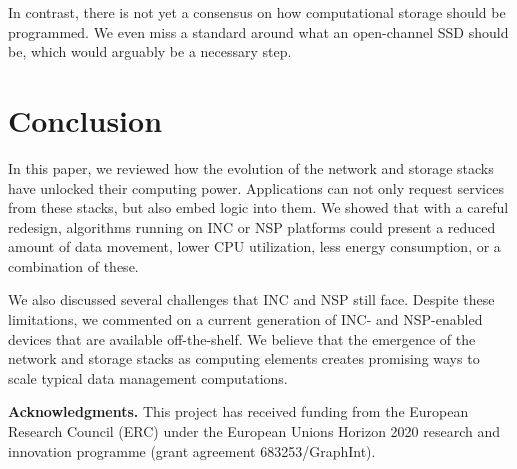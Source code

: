 \documentclass[11pt,dvipdfmx]{article}
\newcommand{\softsec}[1]{\vspace{1em}\noindent\textbf{#1}}
\begin{document}
In contrast, there is not yet a consensus on how computational storage should be
programmed.
We even miss a standard around what an open-channel SSD should be, which would
arguably be a necessary step.


\section{Conclusion}
\label{sec:conclusion}

In this paper, we reviewed how the evolution of the network and storage stacks
have unlocked their computing power.
Applications can not only request services from these stacks, but also
embed logic into them.
We showed that with a careful redesign, algorithms running on INC or NSP
platforms could present a reduced amount of data movement, lower CPU
utilization, less energy consumption, or a combination of these.


We also discussed several challenges that INC and NSP still face.
Despite these limitations, we commented on a current generation of INC- and
NSP-enabled devices that are available off-the-shelf.
We believe that the emergence of the network and storage stacks as computing
elements creates promising ways to scale typical data management computations.


\softsec{Acknowledgments.}
%
This project has received funding from the European Research Council (ERC) under
the European Unions Horizon 2020 research and innovation programme (grant
agreement 683253/GraphInt).
\end{document}
